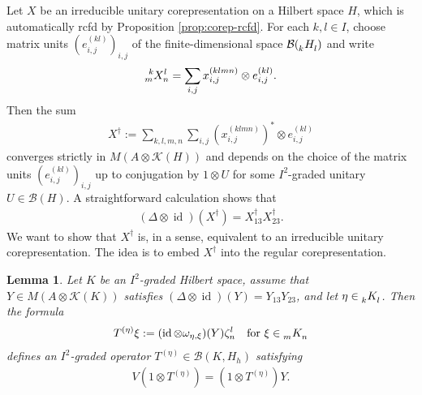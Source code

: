 \documentclass[11pt]{article}
\DeclareMathOperator{\id}{id}
\newcommand{\Gr}[5]{\tensor*[^{#2}_{#4}]{#1}{^{#3}_{#5}}}%
\newcommand{\Grd}[3]{\Gr{#1}{}{}{#2}{#3}}
\newtheorem{Lem}[Theorem]{Lemma}
\theoremstyle{definition}
\numberwithin{equation}{section}
\begin{document}
Let $X$ be an irreducible unitary corepresentation on a Hilbert space $H$, which is automatically
rcfd by Proposition \ref{prop:corep-rcfd}. For each $k,l \in I$, choose matrix units
$(e^{(kl)}_{i,j})_{i,j}$ of the finite-dimensional space $\mathcal{B}(\Grd{H}{k}{l})$ and write
  \begin{align*}
    \Gr{X}{k}{l}{m}{n} =  \sum_{i,j} x^{(klmn)}_{i,j} \otimes e^{(kl)}_{i,j}.
  \end{align*}
Then the sum
\begin{align*}
X^{\dag}:=  \sum_{k,l,m,n} \sum_{i,j} (x^{(klmn)}_{i,j})^{*} \otimes
  e^{(kl)}_{i,j} 
\end{align*}
converges strictly in $M(A \otimes \mathcal{K}(H))$ and depends on the
choice of the matrix units $(e^{(kl)}_{i,j})_{i,j}$ up to conjugation
by $1\otimes U$ for some $I^{2}$-graded unitary $U\in \mathcal{B}(H)$.
  A straightforward calculation shows that
  \begin{align*}
    (\Delta \otimes \id)(X^{\dag}) = X^{\dag}_{13}X^{\dag}_{23}.
  \end{align*}
We want to show that $X^{\dag}$ is, in a sense, equivalent to an irreducible unitary  corepresentation. The idea is to embed
$X^{\dag}$ into the regular corepresentation.
\begin{Lem} \label{lem:construct-intertwiner}
  Let $K$ be an $I^{2}$-graded Hilbert space, assume that $Y\in M(A
  \otimes \mathcal{K}(K))$ satisfies $(\Delta \otimes
  \id)(Y)=Y_{13}Y_{23}$, and let $\eta\in \Grd{K}{k}{l}$. Then the formula
  \begin{align*}
    T^{(\eta)} \xi := (\id \otimes \omega_{\eta,\xi})(Y) \zeta^{l}_{n}
    \quad \text{for } \xi \in \Grd{K}{m}{n}
  \end{align*}
  defines an $I^{2}$-graded  operator $T^{(\eta)} \in \mathcal{B}(K,H_{h})$ satisfying
  \begin{align*}
    V(1\otimes T^{(\eta)}) = (1 \otimes T^{(\eta)})Y.
  \end{align*}
\end{Lem}
\end{document}
